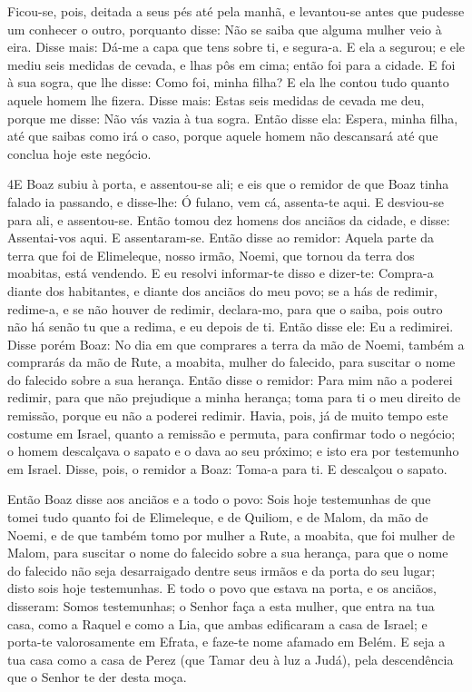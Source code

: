 Ficou-se, pois, deitada a seus pés até pela manhã, e levantou-se
antes que pudesse um conhecer o outro, porquanto disse: Não se saiba
que alguma mulher veio à eira. Disse mais: Dá-me a capa que
tens sobre ti, e segura-a. E ela a segurou; e ele mediu seis medidas
de cevada, e lhas pôs em cima; então foi para a cidade. E foi
à sua sogra, que lhe disse: Como foi, minha filha? E ela lhe contou
tudo quanto aquele homem lhe fizera. Disse mais: Estas seis
medidas de cevada me deu, porque me disse: Não vás vazia à tua
sogra. Então disse ela: Espera, minha filha, até que saibas
como irá o caso, porque aquele homem não descansará até que conclua
hoje este negócio.

\medskip

\lettrine{4} E Boaz subiu à porta, e assentou-se ali; e eis
que o remidor de que Boaz tinha falado ia passando, e disse-lhe: Ó
fulano, vem cá, assenta-te aqui. E desviou-se para ali, e
assentou-se. Então tomou dez homens dos anciãos da cidade, e
disse: Assentai-vos aqui. E assentaram-se. Então disse ao
remidor: Aquela parte da terra que foi de Elimeleque, nosso irmão,
Noemi, que tornou da terra dos moabitas, está vendendo. E eu
resolvi informar-te disso e dizer-te: Compra-a diante dos
habitantes, e diante dos anciãos do meu povo; se a hás de redimir,
redime-a, e se não houver de redimir, declara-mo, para que o saiba,
pois outro não há senão tu que a redima, e eu depois de ti. Então
disse ele: Eu a redimirei. Disse porém Boaz: No dia em que
comprares a terra da mão de Noemi, também a comprarás da mão de
Rute, a moabita, mulher do falecido, para suscitar o nome do
falecido sobre a sua herança. Então disse o remidor: Para mim
não a poderei redimir, para que não prejudique a minha herança; toma
para ti o meu direito de remissão, porque eu não a poderei redimir.
Havia, pois, já de muito tempo este costume em Israel, quanto a
remissão e permuta, para confirmar todo o negócio; o homem
descalçava o sapato e o dava ao seu próximo; e isto era por
testemunho em Israel. Disse, pois, o remidor a Boaz: Toma-a para
ti. E descalçou o sapato.

Então Boaz disse aos anciãos e a todo o povo: Sois hoje
testemunhas de que tomei tudo quanto foi de Elimeleque, e de
Quiliom, e de Malom, da mão de Noemi, e de que também tomo
por mulher a Rute, a moabita, que foi mulher de Malom, para suscitar
o nome do falecido sobre a sua herança, para que o nome do falecido
não seja desarraigado dentre seus irmãos e da porta do seu lugar;
disto sois hoje testemunhas. E todo o povo que estava na
porta, e os anciãos, disseram: Somos testemunhas; o Senhor faça a
esta mulher, que entra na tua casa, como a Raquel e como a Lia, que
ambas edificaram a casa de Israel; e porta-te valorosamente em
Efrata, e faze-te nome afamado em Belém. E seja a tua casa
como a casa de Perez (que Tamar deu à luz a Judá), pela descendência
que o Senhor te der desta moça.


